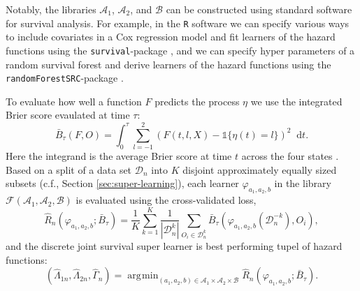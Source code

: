 \documentclass[lineno]{biometrika}
\renewcommand{\phi}{\varphi}
\newcommand*\diff{\mathop{}\!\mathrm{d}}
\newcommand{\1}{\mathds{1}}
\DeclareMathOperator*{\argmin}{\arg\!\min}
\newcommand{\data}{\ensuremath{\mathcal{D}}}
\begin{document}
  Notably, the libraries \( \mathcal{A}_1 \), \(
\mathcal{A}_2 \), and \( \mathcal{B} \) can be constructed using
standard software for survival analysis.  For example, in the
\texttt{R} software we can specify various ways to include covariates
in a Cox regression model and fit learners of the hazard functions
using the \texttt{survival}-package \citep{survival-package}, and we
can specify hyper parameters of a random survival forest and derive
learners of the hazard functions using the
\texttt{randomForestSRC}-package \citep{randomForestSRC}.

To evaluate how well a function \( F \) predicts the
process $\eta$ we use the integrated Brier score \citep{graf1999assessment}
evaulated at time \(\tau\):
\begin{equation*}
  \bar B_\tau(F,O) = \int_0^{\tau} \sum_{l=-1}^{2}
  \left(
      F(t,l,X) - \1{\{\eta(t)=l\}}
  \right)^2\diff t.
\end{equation*} Here the integrand is the average Brier score at time \(t\) across
the four states \citep{brier1950verification}. Based on a split of a
data set \(\data_n\) into $K$ disjoint approximately equally sized
subsets (c.f., Section \ref{sec:super-learning}), each learner \(
\phi_{a_1, a_2, b} \) in the library \( \mathcal{F}(\mathcal{A}_1,
\mathcal{A}_2, \mathcal{B}) \) is evaluated using the cross-validated
loss,
\begin{equation*}
  \hat{R}_{n}(\phi_{a_1,a_2,b} ; \bar{B}_{\tau}) =
  \frac{1}{K}\sum_{k=1}^{K}
  \frac{1}{| \data_n^{k} |}\sum_{O_i \in \data_n^{k}}
  \bar B_\tau
  {
    \left(
      \phi_{a_1,a_2,b}{ (\data_n^{-k})}
      , O_i
    \right)
  },
\end{equation*}
and the discrete joint survival super learner is best performing tupel of hazard functions:
\begin{equation}\label{eq:discrete-JSLL}
  (\hat \Lambda_{1n},\hat \Lambda_{2n}, \hat \Gamma_{n})
  =  \argmin_{(a_1,a_2,b)\in \mathcal{A}_1\times\mathcal{A}_2\times\mathcal{B}}
    \hat{R}_{n}(\phi_{a_1,a_2,b} ; \bar{B}_{\tau}).
\end{equation}
  

\end{document}
